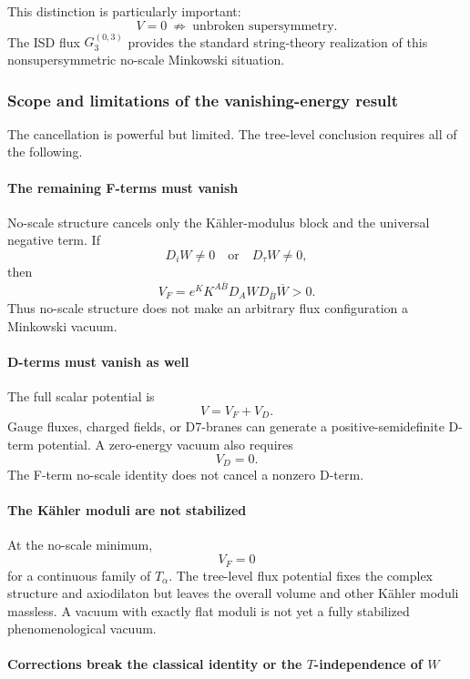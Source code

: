 \documentclass[
  10pt,
  a4paper,
  openany]{book}
\begin{document}
This distinction is particularly important: \[
\boxed{
V=0\ \not\Longrightarrow\ \text{unbroken supersymmetry}.
}
\] The ISD flux \(G_3^{(0,3)}\) provides the standard string-theory
realization of this nonsupersymmetric no-scale Minkowski situation.

\subsubsection{Scope and limitations of the vanishing-energy
result}\label{scope-and-limitations-of-the-vanishing-energy-result}

The cancellation is powerful but limited. The tree-level conclusion
requires all of the following.

\paragraph{The remaining F-terms must
vanish}\label{the-remaining-f-terms-must-vanish}

No-scale structure cancels only the Kähler-modulus block and the
universal negative term. If \[
D_iW\neq0
\quad\text{or}\quad
D_\tau W\neq0,
\] then \[
V_F=e^K K^{A\bar B}D_AW
D_{\bar B}\overline W>0.
\] Thus no-scale structure does not make an arbitrary flux configuration
a Minkowski vacuum.

\paragraph{D-terms must vanish as
well}\label{d-terms-must-vanish-as-well}

The full scalar potential is \[
V=V_F+V_D.
\] Gauge fluxes, charged fields, or D7-branes can generate a
positive-semidefinite D-term potential. A zero-energy vacuum also
requires \[
V_D=0.
\] The F-term no-scale identity does not cancel a nonzero D-term.

\paragraph{The Kähler moduli are not
stabilized}\label{the-kuxe4hler-moduli-are-not-stabilized}

At the no-scale minimum, \[
V_F=0
\] for a continuous family of \(T_\alpha\). The tree-level flux
potential fixes the complex structure and axiodilaton but leaves the
overall volume and other Kähler moduli massless. A vacuum with exactly
flat moduli is not yet a fully stabilized phenomenological vacuum.

\paragraph{\texorpdfstring{Corrections break the classical identity or
the \(T\)-independence of
\(W\)}{Corrections break the classical identity or the T-independence of W}}\label{corrections-break-the-classical-identity-or-the-t-independence-of-w}
\end{document}
